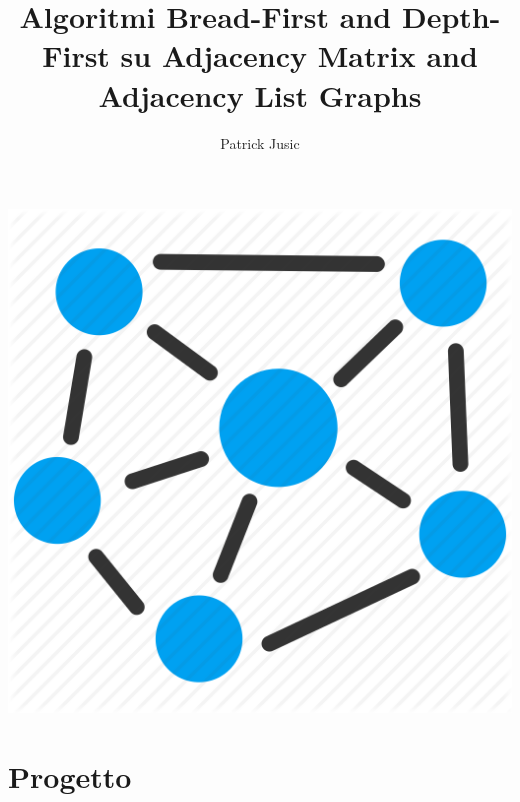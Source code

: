 \documentclass{article}
\title{Algoritmi Bread-First and Depth-First su Adjacency Matrix and Adjacency List Graphs}
\author{Patrick Jusic}
\begin{document}
\maketitle{}
\paragraph{}
\paragraph{}
\paragraph{}

  \includegraphics[width=\linewidth]{graph.png}


\newpage
\tableofcontents
\newpage
{}

\section{Progetto}
\end{document}
